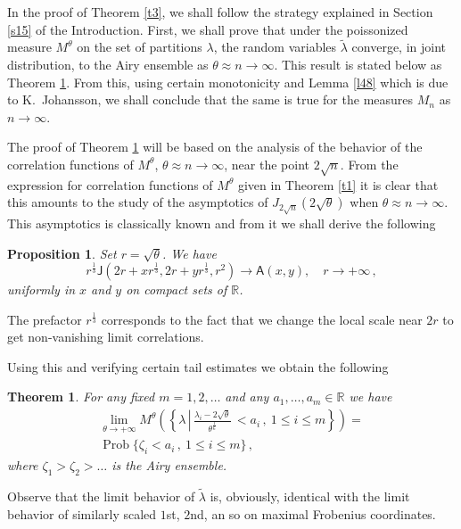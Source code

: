 \documentclass[12pt]{amsart}
\newcommand{\la}{\lambda}
\newcommand{\Prob}{\operatorname{Prob}}
\newcommand{\A}{\mathsf{A}}
\newcommand{\J}{\mathsf{J}}
\newcommand{\R}{\mathbb{R}}
\newcommand{\ix}{\theta}
\theoremstyle{plain}
\newtheorem{theorem}{Theorem}
\newtheorem{proposition}[lemma]{Proposition}
\theoremstyle{definition}
\numberwithin{equation}{section}
\begin{document}
In the proof of Theorem \ref{t3}, we shall follow the strategy explained in Section \ref{s15}
of the Introduction. First, we shall prove that under 
the poissonized measure $M^\ix$ on the set of partitions $\la$, the random variables
$\widetilde{\la}$ 
 converge, in joint distribution,  
to the Airy ensemble as $\ix\approx n\to\infty$.  This result is stated below as
Theorem \ref{t4}. From this, using certain monotonicity and 
Lemma \ref{l48} which is  due to K.~Johansson, we shall conclude 
that the same is true for the measures $M_n$ as $n\to\infty$. 

The proof of Theorem \ref{t4} will be based on the analysis of
 the behavior of the correlation functions
 of $M^\ix$, $\ix\approx n \to \infty$, near the point $2\sqrt{n}$.  From 
the expression for correlation functions of $M^\ix$ given in Theorem \ref{t1}
it is clear that this amounts to the study of  the asymptotics of $J_{2\sqrt{n}}(2\sqrt\ix)$
when $\ix\approx n \to \infty$.  This asymptotics is classically known
and from it we shall derive the following 

\begin{proposition}\label{p41} Set $r=\sqrt\ix$. We have 
%
\begin{equation*}
r^{\frac 13}\J\left(2r+xr^{\frac 13},2r+yr^{\frac 13},{r^2} \right)\to \A(x,y), 
\quad r\to+\infty\,,
\end{equation*}
%
uniformly in $x$ and $y$ on compact sets of $\R$.
\end{proposition} 

The prefactor $r^{\frac 13}$ corresponds to the fact that we change the local
scale  near $2r$  to get  non-vanishing limit correlations.  

Using this and verifying certain tail estimates we obtain the following 

\begin{theorem}\label{t4}
For any fixed $m=1,2,\dots$ and any $a_1,\dots,a_m\in\R$ we have 
%
\begin{multline}\label{e401} 
\lim_{\ix\to+\infty}
M^\ix\left(\left\{\la\,\left|\,
\frac{\la_i-2\sqrt{\ix}}{\ix^{\frac 16}}\,< a_i\,, \  1\le i\le 
m\right.\right\}\right)=\\
\Prob\{\zeta_i< a_i\,,\  1\le i\le m\}\,,
\end{multline}
%
where $\zeta_1>\zeta_2>\dots$ is the Airy ensemble. 
\end{theorem} 

Observe that the limit behavior of $\widetilde{\la}$ is, obviously, identical
with the limit behavior of similarly scaled $1$st, $2$nd, an so on maximal
Frobenius coordinates. 
\end{document}
